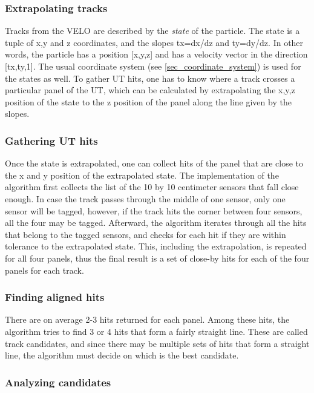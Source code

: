 \documentclass[12pt]{article}
\begin{document}
\subsubsection{Extrapolating tracks}

Tracks from the VELO are described by the \textit{state} of the particle. The state is a tuple of x,y and z coordinates, and the slopes tx=dx/dz and ty=dy/dz. In other words, the particle has a position [x,y,z] and has a velocity vector in the direction [tx,ty,1]. The usual coordinate system (see \ref{sec_coordinate_system}) is used for the states as well. To gather UT hits, one has to know where a track crosses a particular panel of the UT, which can be calculated by extrapolating the x,y,z position of the state to the z position of the panel along the line given by the slopes.


\subsubsection{Gathering UT hits}

Once the state is extrapolated, one can collect hits of the panel that are close to the x and y position of the extrapolated state. The implementation of the algorithm first collects the list of the 10 by 10 centimeter sensors that fall close enough. In case the track passes through the middle of one sensor, only one sensor will be tagged, however, if the track hits the corner between four sensors, all the four may be tagged. Afterward, the algorithm iterates through all the hits that belong to the tagged sensors, and checks for each hit if they are within tolerance to the extrapolated state. This, including the extrapolation, is repeated for all four panels, thus the final result is a set of close-by hits for each of the four panels for each track.


\subsubsection{Finding aligned hits}

There are on average 2-3 hits returned for each panel. Among these hits, the algorithm tries to find 3 or 4 hits that form a fairly straight line. These are called track candidates, and since there may be multiple sets of hits that form a straight line, the algorithm must decide on which is the best candidate.


\subsubsection{Analyzing candidates}
\end{document}
